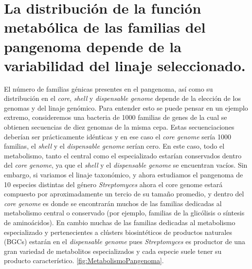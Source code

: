 \documentclass[12pt,twoside]{reedthesis}
\begin{document}
  \section{La distribución de la función metabólica de las familias del
  pangenoma depende de la variabilidad del linaje
  seleccionado.}\label{la-distribucion-de-la-funcion-metabolica-de-las-familias-del-pangenoma-depende-de-la-variabilidad-del-linaje-seleccionado.}
  
  El número de familias génicas presentes en el pangenoma, así como su
  distribución en el \emph{core}, \emph{shell} y \emph{dispensable genome}
  depende de la elección de los genomas y del linaje genómico. Para
  entender esto se puede pensar en un ejemplo extremo, consideremos una
  bacteria de 1000 familias de genes de la cual se obtienen secuencias de
  diez genomas de la misma cepa. Estas secuenciaciones deberían ser
  prácticamente idénticas y en ese caso el \emph{core genome} sería 1000
  familias, el \emph{shell} y el \emph{dispensable genome} serían cero. En
  este caso, todo el metabolismo, tanto el central como el especializado
  estarían conservados dentro del \emph{core genome}, ya que el
  \emph{shell} y el \emph{dispensable genome} se encuentran vacíos. Sin
  embargo, si variamos el linaje taxonómico, y ahora estudiamos el
  pangenoma de 10 especies distintas del género \emph{Streptomyces} ahora
  el core genome estará compuesto por aproximadamente un tercio de su
  tamaño promedio, y dentro del \emph{core genome} es donde se encontrarán
  muchos de las familias dedicadas al metabolismo central o conservado
  (por ejemplo, familias de la glicólisis o síntesis de aminoácidos). En
  cambio muchas de las familias dedicadas al metabolismo especializado y
  pertenecientes a clústers biosintéticos de productos naturales (BGCs)
  estarán en el \emph{dispensable genome} pues \emph{Streptomyces} es
  productor de una gran variedad de metabolitos especializados y cada
  especie suele tener su producto característico.
  \autoref{fig:MetabolismoPangenoma}.
  
\end{document}
